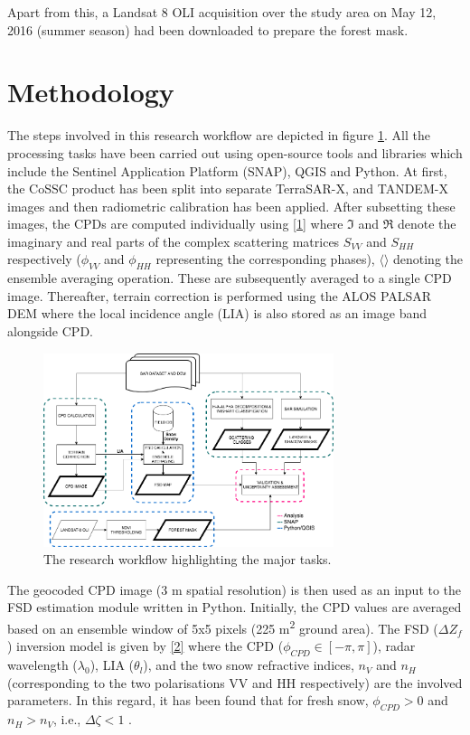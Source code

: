 \documentclass{article}
\begin{document}
Apart from this, a Landsat 8 OLI acquisition over the study area on May 12, 2016 (summer season) had been downloaded to prepare the forest mask.    

\section{Methodology}
\label{sec:method}
The steps involved in this research workflow are depicted in figure \ref{fig:work}. All the processing tasks have been carried out using open-source tools and libraries which include the Sentinel Application Platform (SNAP), QGIS and Python. At first, the CoSSC product has been split into separate TerraSAR-X, and TANDEM-X images and then radiometric calibration has been applied. After subsetting these images, the CPDs are computed individually using \eqref{1} where $\Im$ and $\Re$ denote the imaginary and real parts of the complex scattering matrices $S_{VV}$ and $S_{HH}$ respectively ($\phi_{VV}$ and $\phi_{HH}$ representing the corresponding phases), $\langle\rangle$ denoting the ensemble averaging operation. These are subsequently averaged to a single CPD image. Thereafter, terrain correction is performed using the ALOS PALSAR DEM where the local incidence angle (LIA) is also stored as an image band alongside CPD. 

\begin{figure}[htb]
\centering
\includegraphics[width=8.5cm]{Pictures/Method_FSD.png}
\vspace{-2ex}
\caption{The research workflow highlighting the major tasks.}
\label{fig:work}
\end{figure}

The geocoded CPD image (3 m spatial resolution) is then used as an input to the FSD estimation module written in Python. Initially, the CPD values are averaged based on an ensemble window of 5x5 pixels (225 m\textsuperscript{2} ground area). The FSD ($\Delta Z_f$) inversion model is given by \eqref{2} where the CPD ($\phi_{CPD}\in[-\pi,\pi]$), radar wavelength ($\lambda_0$), LIA ($\theta_l$), and the two snow refractive indices, $n_V$ and $n_H$ (corresponding to the two polarisations VV and HH respectively) are the involved parameters. In this regard, it has been found that for fresh snow,  $\phi_{CPD}>0$ and $n_H>n_V$, i.e., $\Delta{\zeta}<1$ \cite{Leinss2014}.
\end{document}
